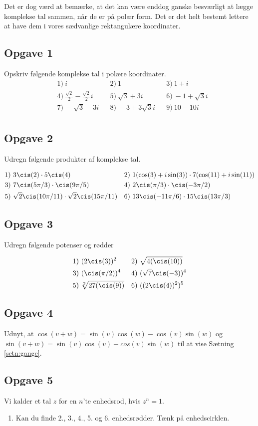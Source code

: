 Det er dog værd at bemærke, at det kan være enddog ganske besværligt at lægge komplekse tal sammen, når de er på polær form. Det er det helt bestemt lettere at have dem i vores sædvanlige rektangulære koordinater.
\subsection*{Opgave 1}
Opskriv følgende komplekse tal i polære koordinater. 
\begin{align*}
	&1) \ i   &&2) \  1   &&3) \ 1 + i  \\
	&4) \ \frac{\sqrt{2}}{2} - \frac{\sqrt{2}}{2}i  &&5) \  \sqrt{3} + 3i   &&6) \  -1 + \sqrt{3}i \\
	&7) \ -\sqrt{3} -3i   &&8) \ -3 + 3\sqrt{3} i    &&9) \ 10 - 10i  \\ 
\end{align*}
 
\subsection*{Opgave 2}
Udregn følgende produkter af komplekse tal.

\begin{align*}
	&1) \  3\cis(2)\cdot 5\cis(4)  &&2) \ 1(\cos(3) + i \sin(3))\cdot 7(\cos(11) + i \sin(11))  \\
	&3) \  7\cis(5\pi/3)\cdot \cis(9\pi/5)  &&4) \ 2\cis(\pi/3)\cdot \cis(-3\pi/2)  \\
	&5) \  \sqrt{2}\cis(10\pi/11)\cdot \sqrt{2}\cis(15\pi/11) 
	 &&6) \ 13\cis(-11\pi/6)\cdot 15\cis(13\pi/3)  \\
\end{align*}

\subsection*{Opgave 3}

Udregn følgende potenser og rødder

\begin{align*}
	&1) \ (2\cis(3))^2  &&2) \ \sqrt{4(\cis(10))} \\
	&3) \ (\cis(\pi/2))^4  &&4) \ (\sqrt{7}\cis(-3))^4  \\
	&5) \  \sqrt[3]{27(\cis(9))} &&6) \  ((2\cis(4))^2)^5  \\
\end{align*}


\subsection*{Opgave 4}

Udnyt, at $\cos(v + w) =  \sin(v)\cos(w) - \cos(v)\sin(w)$ og $\sin(v + w) = \sin(v)\cos(v)-cos(v)\sin(w)$ til at vise Sætning \ref{setn:gange}.

\subsection*{Opgave 5}
Vi kalder et tal $z$ for en $n$'te enhedsrod, hvis $z^n = 1$. 
\begin{enumerate}[label=\roman*)]
	\item Kan du finde 2., 3., 4., 5. og 6. enhedsrødder. Tænk på enhedscirklen.
\end{enumerate}
 